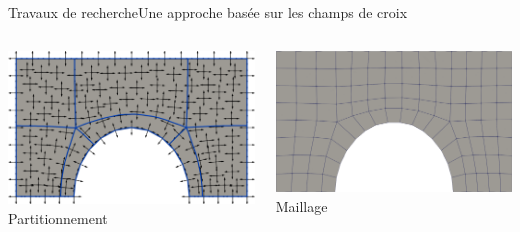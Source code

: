 \documentclass[compress,10pt,aspectratio=169]{beamer}
\begin{document}
\begin{frame}{Travaux de recherche}{Une approche basée sur les champs de croix}
\begin{columns}
\begin{column}{0.25\textwidth}
\centering
\includegraphics[scale=0.068]{images/frey_5.pdf}\hspace{0.2cm}
\footnotesize Partitionnement
\end{column}

\begin{column}{0.25\textwidth}
\centering
\includegraphics[scale=0.07]{images/frey_6.pdf}\vspace{0.05cm}
\footnotesize Maillage
\end{column}
\end{columns}

\vspace{0.2cm}

\end{frame}
\end{document}
